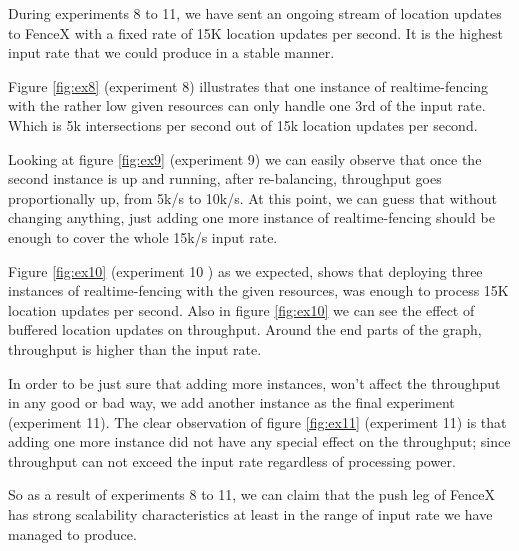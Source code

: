 \documentclass[a4]{report}
\begin{document}
    During experiments 8 to 11, we have sent an ongoing stream of location updates to FenceX with a fixed rate of 15K
    location updates per second.
    It is the highest input rate that we could produce in a stable manner.

    Figure \ref{fig:ex8} (experiment 8) illustrates that one instance of realtime-fencing with the rather low given
    resources can only handle one 3rd of the input rate.
    Which is 5k intersections per second out of 15k location updates per second.

    Looking at figure \ref{fig:ex9}  (experiment 9) we can easily observe that once the second instance is up and
    running, after re-balancing, throughput goes proportionally up, from 5k/s to 10k/s.
    At this point, we can guess that without changing anything, just adding one more instance of realtime-fencing
    should be enough to cover the whole 15k/s input rate.

    Figure \ref{fig:ex10} (experiment 10 ) as we expected, shows that deploying three instances of realtime-fencing
    with the given resources, was enough to process 15K location updates per second.
    Also in figure \ref{fig:ex10} we can see the effect of buffered location updates on throughput.
    Around the end parts of the graph, throughput is higher than the input rate.

    In order to be just sure that adding more instances, won't affect the throughput in any good or bad way, we
    add another instance as the final experiment (experiment 11).
    The clear observation of figure \ref{fig:ex11} (experiment 11) is that adding one more instance did not have any
    special effect on the throughput;
    since throughput can not exceed the input rate regardless of processing power.

    So as a result of experiments 8 to 11, we can claim that the push leg of FenceX has strong scalability characteristics
    at least in the range of input rate we have managed to produce.
\end{document}
